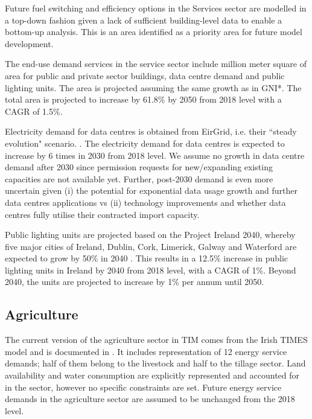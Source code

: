 \documentclass[gmd,manuscript]{copernicus}
\begin{document}
Future fuel switching and efficiency options in the Services sector are modelled in a top-down fashion given a lack of sufficient building-level data to enable a bottom-up analysis. This is an area identified as a priority area for future model development. 

The end-use demand services in the service sector include million meter square of area for public and private sector buildings, data centre demand and public lighting units. The area is projected assuming the same growth as in GNI*. The total area is projected to increase by 61.8\% by 2050 from 2018 level with a CAGR of 1.5\%. 

Electricity demand for data centres is obtained from EirGrid, i.e. their ``steady evolution" scenario. \citep{EirGridT57:online}. The electricity demand for data centres is expected to increase by 6 times in 2030 from 2018 level. We assume no growth in data centre demand after 2030 since permission requests for new/expanding existing capacities are not available yet. Further, post-2030 demand is even more uncertain given (i) the potential for exponential data usage growth and further data centres applications vs (ii) technology improvements and whether data centres fully utilise their contracted import capacity.  

Public lighting units are projected based on the Project Ireland 2040, whereby five major cities of Ireland, Dublin, Cork, Limerick, Galway and Waterford are expected to grow by 50\% in 2040 \citep{GovernmentofIreland2018}. This results in a 12.5\% increase in public lighting units in Ireland by 2040 from 2018 level, with a CAGR of 1\%. Beyond 2040, the units are projected to increase by 1\% per annum until 2050.

\subsection{Agriculture}
\label{ss:agriculture}
The current version of the agriculture sector in TIM comes from the Irish TIMES model and is documented in \citet{Chiodi2016}. It includes representation of 12 energy service demands; half of them belong to the livestock and half to the tillage sector. Land availability and water consumption are explicitly represented and accounted for in the sector, however no specific constraints are set. Future energy service demands in the agriculture sector are assumed to be unchanged from the 2018 level.

\end{document}
